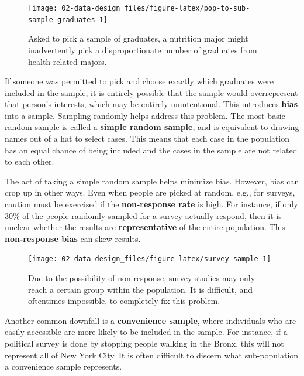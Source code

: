 \documentclass[
  10pt,
  openany]{book}
\begin{document}
\begin{figure}[h]

{\centering \texttt{[image: 02-data-design\_files/figure-latex/pop-to-sub-sample-graduates-1]} 

}

\caption{Asked to pick a sample of graduates, a nutrition major might inadvertently pick a disproportionate number of graduates from health-related majors.}\label{fig:pop-to-sub-sample-graduates}
\end{figure}

If someone was permitted to pick and choose exactly which graduates were included in the sample, it is entirely possible that the sample would overrepresent that person's interests, which may be entirely unintentional.
This introduces \textbf{bias} into a sample.
Sampling randomly helps address this problem.
The most basic random sample is called a \textbf{simple random sample}, and is equivalent to drawing names out of a hat to select cases.
This means that each case in the population has an equal chance of being included and the cases in the sample are not related to each other.

The act of taking a simple random sample helps minimize bias.
However, bias can crop up in other ways.
Even when people are picked at random, e.g., for surveys, caution must be exercised if the \textbf{non-response rate} is high.
For instance, if only 30\% of the people randomly sampled for a survey actually respond, then it is unclear whether the results are \textbf{representative} of the entire population.
This \textbf{non-response bias} can skew results.

\begin{figure}[h]

{\centering \texttt{[image: 02-data-design\_files/figure-latex/survey-sample-1]} 

}

\caption{Due to the possibility of non-response, survey studies may only reach a certain group within the population. It is difficult, and oftentimes impossible, to completely fix this problem.}\label{fig:survey-sample}
\end{figure}

Another common downfall is a \textbf{convenience sample}, where individuals who are easily accessible are more likely to be included in the sample.
For instance, if a political survey is done by stopping people walking in the Bronx, this will not represent all of New York City.
It is often difficult to discern what sub-population a convenience sample represents.
\end{document}
